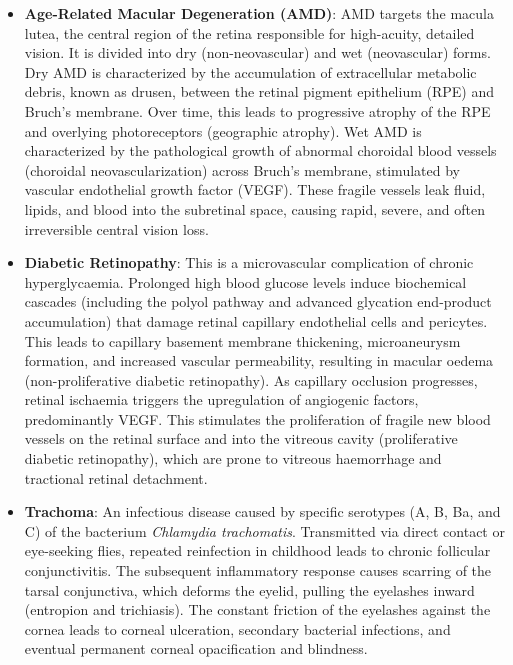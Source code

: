 \begin{itemize}
    \item \textbf{Age-Related Macular Degeneration (AMD)}: AMD targets the macula lutea, the central region of the retina responsible for high-acuity, detailed vision. It is divided into dry (non-neovascular) and wet (neovascular) forms. Dry AMD is characterized by the accumulation of extracellular metabolic debris, known as drusen, between the retinal pigment epithelium (RPE) and Bruch's membrane. Over time, this leads to progressive atrophy of the RPE and overlying photoreceptors (geographic atrophy). Wet AMD is characterized by the pathological growth of abnormal choroidal blood vessels (choroidal neovascularization) across Bruch's membrane, stimulated by vascular endothelial growth factor (VEGF). These fragile vessels leak fluid, lipids, and blood into the subretinal space, causing rapid, severe, and often irreversible central vision loss.
    \item \textbf{Diabetic Retinopathy}: This is a microvascular complication of chronic hyperglycaemia. Prolonged high blood glucose levels induce biochemical cascades (including the polyol pathway and advanced glycation end-product accumulation) that damage retinal capillary endothelial cells and pericytes. This leads to capillary basement membrane thickening, microaneurysm formation, and increased vascular permeability, resulting in macular oedema (non-proliferative diabetic retinopathy). As capillary occlusion progresses, retinal ischaemia triggers the upregulation of angiogenic factors, predominantly VEGF. This stimulates the proliferation of fragile new blood vessels on the retinal surface and into the vitreous cavity (proliferative diabetic retinopathy), which are prone to vitreous haemorrhage and tractional retinal detachment.
    \item \textbf{Trachoma}: An infectious disease caused by specific serotypes (A, B, Ba, and C) of the bacterium \textit{Chlamydia trachomatis}. Transmitted via direct contact or eye-seeking flies, repeated reinfection in childhood leads to chronic follicular conjunctivitis. The subsequent inflammatory response causes scarring of the tarsal conjunctiva, which deforms the eyelid, pulling the eyelashes inward (entropion and trichiasis). The constant friction of the eyelashes against the cornea leads to corneal ulceration, secondary bacterial infections, and eventual permanent corneal opacification and blindness.
\end{itemize}

